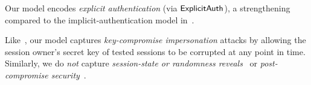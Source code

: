 Our model encodes \emph{explicit authentication} (via $\mathsf{ExplicitAuth}$), a strengthening compared to the implicit-authentication model in~\cite{C:CCGJJ19}.

Like~\cite{C:CCGJJ19,JC:DieJag20}, our model captures \emph{key-compromise impersonation} attacks by allowing the session owner's secret key of tested sessions to be corrupted at any point in time.
Similarly, we do \emph{not} capture \emph{session-state or randomness reveals}~\cite{EC:CanKra01,PROVSEC:LaMLauMit07} or \emph{post-compromise security}~\cite{CSF:CohCreGar16}.





